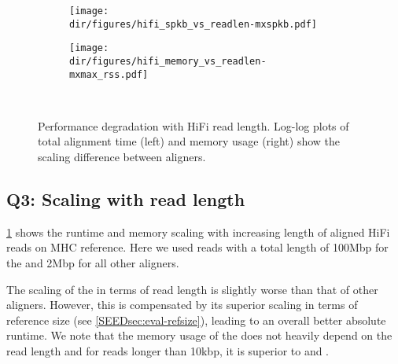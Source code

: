 \begin{figure}[t]
	\begin{subfigure}{.49\textwidth}
	  \centering
	  \texttt{[image: \\dir/figures/hifi\_spkb\_vs\_readlen-mxspkb.pdf]}
	\end{subfigure}%
	\begin{subfigure}{.45\textwidth}
	  \centering
	  \texttt{[image: \\dir/figures/hifi\_memory\_vs\_readlen-mxmax\_rss.pdf]}
	\end{subfigure}~\hspace{1em} \caption{Performance degradation with HiFi read
	 length. Log-log plots of total alignment time (left) and memory usage (right)
	 show the scaling difference between aligners.}
	\label{SEEDfig:hifi_scaling_with_readlen}
  \end{figure}

\subsection{Q3: Scaling with read length}

\cref{SEEDfig:hifi_scaling_with_readlen} shows the runtime and memory scaling with
increasing length of aligned HiFi reads on MHC reference. Here we used reads
with a total length of 100Mbp for the \seedh and 2Mbp for all other aligners.

The scaling of the \seedh in terms of read length is slightly worse than that of
other aligners. However, this is compensated by its superior scaling in terms of
reference size (see \cref{SEEDsec:eval-refsize}), leading to an overall better
absolute runtime. We note that the memory usage of the \seedh does not heavily
depend on the read length and for reads longer than 10kbp, it is superior to
\graphaligner and \vargas.

